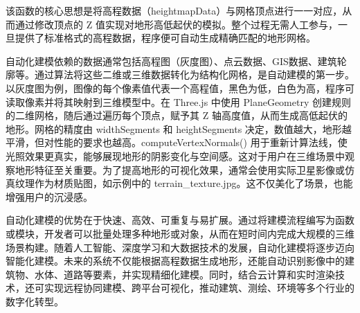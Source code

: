 \begin{Shaded}
\begin{Highlighting}[]
\NormalTok{\}}

\NormalTok{()}\OperatorTok{;}


\OperatorTok{=} \NormalTok{(\{}

\OperatorTok{:}\NormalTok{(}\SpecialCharTok{\textbackslash{}\_}\NormalTok{)}\OperatorTok{,}

\OperatorTok{:}

\NormalTok{\})}\OperatorTok{;}

 \OperatorTok{,}\OperatorTok{;}

\NormalTok{\}}
\end{Highlighting}
\end{Shaded}

该函数的核心思想是将高程数据（heightmapData）与网格顶点进行一一对应，从而通过修改顶点的 Z 值实现对地形高低起伏的模拟。整个过程无需人工参与，一旦提供了标准格式的高程数据，程序便可自动生成精确匹配的地形网格。

自动化建模依赖的数据通常包括高程图（灰度图）、点云数据、GIS数据、建筑轮廓等。通过算法将这些二维或三维数据转化为结构化网格，是自动建模的第一步。以灰度图为例，图像的每个像素值代表一个高程值，黑色为低，白色为高，程序可读取像素并将其映射到三维模型中。在 Three.js 中使用 PlaneGeometry 创建规则的二维网格，随后通过遍历每个顶点，赋予其 Z 轴高度值，从而生成高低起伏的地形。网格的精度由 widthSegments 和 heightSegments 决定，数值越大，地形越平滑，但对性能的要求也越高。computeVertexNormals() 用于重新计算法线，使光照效果更真实，能够展现地形的阴影变化与空间感。这对于用户在三维场景中观察地形特征至关重要。为了提高地形的可视化效果，通常会使用实际卫星影像或仿真纹理作为材质贴图，如示例中的 terrain\_texture.jpg。这不仅美化了场景，也能增强用户的沉浸感。

自动化建模的优势在于快速、高效、可重复与易扩展。通过将建模流程编写为函数或模块，开发者可以批量处理多种地形或对象，从而在短时间内完成大规模的三维场景构建。随着人工智能、深度学习和大数据技术的发展，自动化建模将逐步迈向智能化建模。未来的系统不仅能根据高程数据生成地形，还能自动识别影像中的建筑物、水体、道路等要素，并实现精细化建模。同时，结合云计算和实时渲染技术，还可实现远程协同建模、跨平台可视化，推动建筑、测绘、环境等多个行业的数字化转型。

